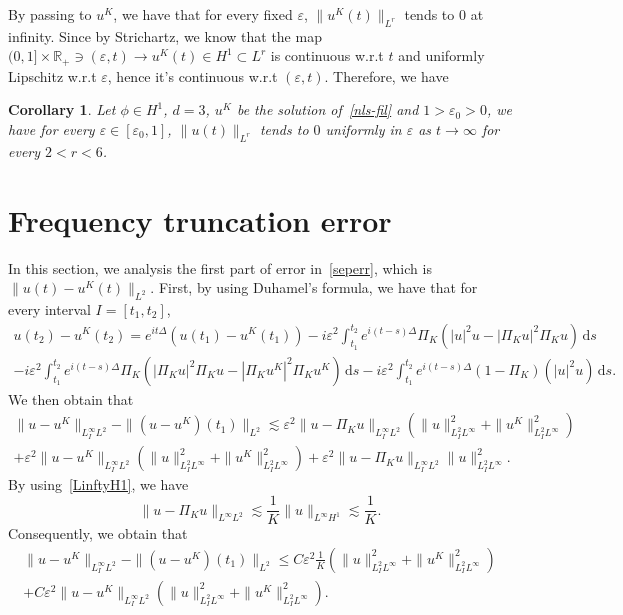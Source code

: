 \documentclass[10pt,a4paper]{article}
\newtheorem{corollary}[theorem]{Corollary}
\begin{document}
  By passing to \(u^K\), we have that for every fixed \(\varepsilon\),
  \(\|u^K(t)\|_{L^r}\) tends to \(0\) at infinity. Since by Strichartz, we know
  that the map \( (0,1] \times \mathbb R_+ \ni (\varepsilon,t) \to u^K(t) \in
  H^1 \subset L^r\) is continuous w.r.t \(t\) and uniformly Lipschitz w.r.t
  \(\varepsilon\), hence it's continuous w.r.t \((\varepsilon,t)\). Therefore,
  we have 
  \begin{corollary}
    Let \(\phi \in H^1\), \( d = 3 \), \(u^K\) be the solution of~\eqref{nls-fil} 
    and \(1 > \varepsilon_0 > 0\), we have for every \(\varepsilon \in
    [\varepsilon_0,1]\), \(\|u(t)\|_{L^r}\) tends to \(0\) uniformly in
    \(\varepsilon\) as \(t \to \infty \) for every \( 2 < r < 6\). 
  \end{corollary}


  \section{Frequency truncation error}

  In this section, we analysis the first part of error in~\eqref{seperr}, which
  is \(\|u(t)-u^K(t)\|_{L^2}\). First, by using Duhamel's formula, we have
  that for every interval \(I = [t_1 , t_2]\),
  \begin{multline}
    u(t_2) - u^K(t_2) = e^{it\Delta}(u(t_1) - u^K(t_1))  
    - i \varepsilon^2 \int_{t_1}^{t_2} e^{i(t-s)\Delta} \Pi_K (|u|^2u 
    - |\Pi_K u|^2\Pi_K u) \,\mathrm{d}s \\ 
    - i \varepsilon^2 \int_{t_1}^{t_2} e^{i(t-s)\Delta} \Pi_K (|\Pi_K u|^2\Pi_K u 
    - |\Pi_K u^K|^2\Pi_K u^K) \,\mathrm{d}s  
    - i \varepsilon^2 \int_{t_1}^{t_2} e^{i(t-s)\Delta} (1 - \Pi_K)(|u|^2u) 
    \,\mathrm{d}s .
  \end{multline}
  We then obtain that
  \begin{multline}
    \|u-u^K\|_{L^{\infty}_{I}L^2} - \|(u-u^K)(t_1)\|_{L^2} \lesssim
    \varepsilon^2 \| u - \Pi_K u \|_{L^{\infty}_{I}L^2} ( \|u\|^2_{L^2_{I}L^{\infty}} + 
    \|u^K\|^2_{L^2_{I}L^{\infty}} ) \\
    + \varepsilon^2 \| u - u^K \|_{L^{\infty}_{I}L^2} ( \|u\|^2_{L^2_{I}L^{\infty}} + 
    \|u^K\|^2_{L^2_{I}L^{\infty}} ) + \varepsilon^2 \| u - \Pi_K u \|_{L^{\infty}_{I}L^2} 
    \|u\|^2_{L^2_{I}L^{\infty}}.
  \end{multline}
  By using~\eqref{LinftyH1}, we have 
  \[ \|u-\Pi_K u\|_{L^\infty L^2} \lesssim \frac1K \|u\|_{L^\infty H^1} \lesssim
  \frac1K. \]
  Consequently, we obtain that 
  \begin{multline}\label{u-uKLinftyL2}
    \|u-u^K\|_{L^\infty_I L^2} - \|(u-u^K)(t_1)\|_{L^2} \leq C
    \varepsilon^2 \frac1K (\|u\|^2_{L^2_I L^\infty} + 
    \|u^K\|^2_{L^2_I L^\infty} ) \\
    + C \varepsilon^2 \| u - u^K \|_{L^\infty_I L^2} ( \|u\|^2_{L^2_I L^\infty} + 
    \|u^K\|^2_{L^2_I L^\infty} ).
  \end{multline}
\end{document}

